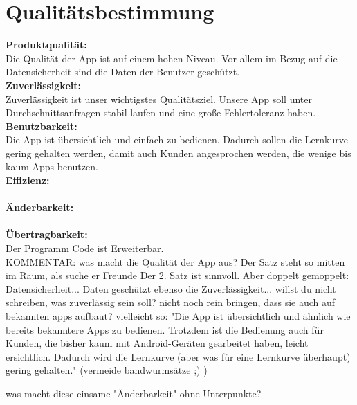 \section{Qualitätsbestimmung}
\textbf{Produktqualität:}\\ %
Die Qualität der App ist auf einem hohen Niveau. Vor allem im Bezug auf die Datensicherheit sind die Daten der Benutzer geschützt.\\
\textbf{Zuverlässigkeit:}\\%
Zuverlässigkeit ist unser wichtigstes Qualitätsziel. Unsere App soll unter Durchschnittsanfragen stabil laufen und eine große Fehlertoleranz haben. \\
\textbf{Benutzbarkeit:}\\ %
Die App ist übersichtlich und einfach zu bedienen. Dadurch sollen die Lernkurve gering gehalten werden, damit auch Kunden angesprochen werden, die wenige bis kaum Apps benutzen.\\
\textbf{Effizienz:}\\ %
\\
\textbf{Änderbarkeit:}\\ %
\\
\textbf{Übertragbarkeit:}\\%
Der Programm Code ist Erweiterbar.\\

KOMMENTAR:
was macht die Qualität der App aus? Der Satz steht so mitten im Raum, als suche er Freunde
Der 2. Satz ist sinnvoll. Aber doppelt gemoppelt: Datensicherheit... Daten geschützt
ebenso die Zuverlässigkeit... willst du nicht schreiben, was zuverlässig sein soll?
nicht noch rein bringen, dass sie auch auf bekannten apps aufbaut? vielleicht so: "Die App ist übersichtlich und ähnlich wie bereits bekanntere Apps zu bedienen. Trotzdem ist die Bedienung auch für Kunden, die bisher kaum mit Android-Geräten gearbeitet haben, leicht ersichtlich. Dadurch wird die Lernkurve (aber was für eine Lernkurve überhaupt) gering gehalten." (vermeide bandwurmsätze ;) )

was macht diese einsame "Änderbarkeit" ohne Unterpunkte?